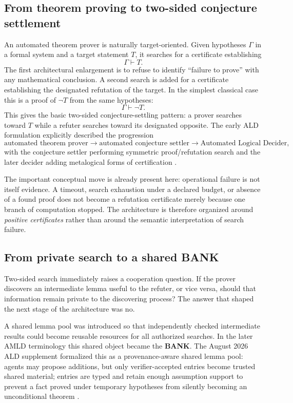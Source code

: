 \documentclass[11pt]{article}
\begin{document}
\subsection{From theorem proving to two-sided conjecture settlement}

An automated theorem prover is naturally target-oriented. Given hypotheses $\Gamma$ in a formal system and a target statement $T$, it searches for a certificate establishing
\[
\Gamma\vdash T.
\]
The first architectural enlargement is to refuse to identify ``failure to prove'' with any mathematical conclusion. A second search is added for a certificate establishing the designated refutation of the target. In the simplest classical case this is a proof of $\neg T$ from the same hypotheses:
\[
\Gamma\vdash \neg T.
\]
This gives the basic two-sided conjecture-settling pattern: a prover searches toward $T$ while a refuter searches toward its designated opposite. The early ALD formulation explicitly described the progression
\[
\text{automated theorem prover}
\longrightarrow
\text{automated conjecture settler}
\longrightarrow
\text{Automated Logical Decider},
\]
with the conjecture settler performing symmetric proof/refutation search and the later decider adding metalogical forms of certification \cite{ald001}.

The important conceptual move is already present here: operational failure is not itself evidence. A timeout, search exhaustion under a declared budget, or absence of a found proof does not become a refutation certificate merely because one branch of computation stopped. The architecture is therefore organized around \emph{positive certificates} rather than around the semantic interpretation of search failure.

\subsection{From private search to a shared BANK}

Two-sided search immediately raises a cooperation question. If the prover discovers an intermediate lemma useful to the refuter, or vice versa, should that information remain private to the discovering process? The answer that shaped the next stage of the architecture was no.

A shared lemma pool was introduced so that independently checked intermediate results could become reusable resources for all authorized searches. In the later AMLD terminology this shared object became the \textbf{BANK}. The August 2026 ALD supplement formalized this as a provenance-aware shared lemma pool: agents may propose additions, but only verifier-accepted entries become trusted shared material; entries are typed and retain enough assumption support to prevent a fact proved under temporary hypotheses from silently becoming an unconditional theorem \cite{ald47}.
\end{document}
